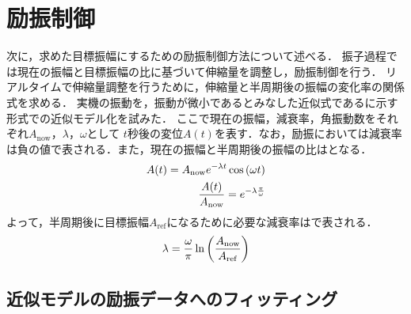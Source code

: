         \section{励振制御}
          次に，求めた目標振幅にするための励振制御方法について述べる．
          振子過程では現在の振幅と目標振幅の比に基づいて伸縮量を調整し，励振制御を行う．
          リアルタイムで伸縮量調整を行うために，伸縮量と半周期後の振幅の変化率の関係式を求める．
          実機の振動を，振動が微小であるとみなした近似式であるに示す形式での近似モデル化を試みた．
          ここで現在の振幅，減衰率，角振動数をそれぞれ$A_{\mathrm{now}}$，$\lambda$，$\omega$として
          $t$秒後の変位$A(t)$を表す．なお，励振においては減衰率は負の値で表される．また，現在の振幅と半周期後の振幅の比はとなる．
          \begin{eqnarray}
            \equlabel{Approximation Model}
            A(t)=A_{\mathrm{now}}e^{-\lambda t}\cos{(\omega t)}\\
            \equlabel{amp rate}
            \frac{A(t)}{A_{\mathrm{now}}}=e^{-\lambda \frac{\pi}{\omega}}
          \end{eqnarray}
          よって，半周期後に目標振幅$A_{\mathrm{ref}}$になるために必要な減衰率はで表される．
          \begin{eqnarray}
            \equlabel{lambda}
            \lambda=\frac{\omega}{\pi}\ln{\left(\frac{A_{\mathrm{now}}}{A_{\mathrm{ref}}}\right)}
          \end{eqnarray}

        \subsection{近似モデルの励振データへのフィッティング}
          
